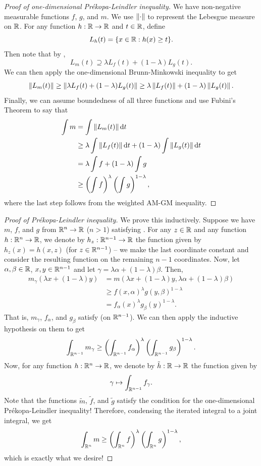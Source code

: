 \begin{proof}[Proof of one-dimensional Pr\'{e}kopa-Leindler inequality]
We have non-negative measurable functions $f$, $g$, and $m$. We use $\left\lVert\cdot\right\rVert$ to represent the Lebesgue measure on $\mathbb{R}$. For any function $h:\mathbb{R}\to\mathbb{R}$ and $t\in\mathbb{R}$, define
\[ L_h(t) = \{x\in\mathbb{R}: h(x)\geq t\}. \]
Then note that by ,
\[ L_m(t) \supseteq \lambda L_f(t) + (1-\lambda)L_g(t). \]
We can then apply the one-dimensional Brunn-Minkowski inequality to get
\[ \left\lVert L_m(t)\right\rVert \geq \left\lVert\lambda L_f(t) + (1-\lambda)L_g(t)\right\rVert \geq \lambda \left\lVert L_f(t)\right\rVert + (1-\lambda)\left\lVert L_g(t)\right\rVert. \]
Finally, we can assume boundedness of all three functions and use Fubini's Theorem to say that
\begin{align*}
    \int m  &= \int \left\lVert L_m(t)\right\rVert\operatorname{d}\!{t} \\
    &\geq \lambda \int \left\lVert L_f(t)\right\rVert\operatorname{d}\!{t} + (1-\lambda) \int \left\lVert L_g(t)\right\rVert\operatorname{d}\!{t} \\
    &= \lambda \int f + (1-\lambda) \int g \\
    &\geq \left(\int f\right)^{\lambda}\left(\int g\right)^{1-\lambda},
\end{align*}
where the last step follows from the weighted AM-GM inequality.
\end{proof}

\begin{proof}[Proof of Pr\'{e}kopa-Leindler inequality]
We prove this inductively. Suppose we have $m$, $f$, and $g$ from $\mathbb{R}^n\to\mathbb{R}$ ($n>1$) satisfying . For any $z\in\mathbb{R}$ and any function $h:\mathbb{R}^n\to \mathbb{R}$, we denote by $h_z:\mathbb{R}^{n-1}\to\mathbb{R}$ the function given by $h_z(x)=h(x,z)$ (for $z\in\mathbb{R}^{n-1}$) -- we make the last coordinate constant and consider the resulting function on the remaining $n-1$ coordinates. Now, let $\alpha,\beta\in\mathbb{R}$, $x,y\in\mathbb{R}^{n-1}$ and let $\gamma = \lambda\alpha + (1-\lambda)\beta$. Then,
\begin{align*}
    m_\gamma(\lambda x + (1-\lambda)y) &= m(\lambda x + (1-\lambda)y, \lambda\alpha + (1-\lambda)\beta) \\
    &\geq f(x,\alpha)^\lambda g(y,\beta)^{1-\lambda} \\
    &= f_\alpha(x)^\lambda g_\beta(y)^{1-\lambda}.
\end{align*}
That is, $m_\gamma$, $f_\alpha$, and $g_\beta$ satisfy  (on $\mathbb{R}^{n-1}$). We can then apply the inductive hypothesis on them to get
\[ \int_{\mathbb{R}^{n-1}} m_\gamma \geq \left(\int_{\mathbb{R}^{n-1}}f_\alpha\right)^\lambda \left(\int_{\mathbb{R}^{n-1}}g_\beta\right)^{1-\lambda}. \]
Now, for any function $h:\mathbb{R}^n\to\mathbb{R}$, we denote by $\tilde{h}:\mathbb{R}\to\mathbb{R}$ the function given by
\[ \gamma \mapsto \int_{\mathbb{R}^{n-1}} f_\gamma. \]
Note that the functions $\tilde{m}$, $\tilde{f}$, and $\tilde{g}$ satisfy the condition for the one-dimensional Pr\'{e}kopa-Leindler inequality! Therefore, condensing the iterated integral to a joint integral, we get
\[ \int_{\mathbb{R}^n} m \geq \left(\int_{\mathbb{R}^n} f\right)^{\lambda}\left(\int_{\mathbb{R}^n} g\right)^{1-\lambda}, \]
which is exactly what we desire!
\end{proof}


